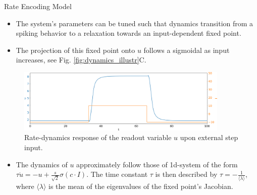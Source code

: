 \documentclass{beamer}
\begin{document}
\begin{frame}[t]
\begin{columns}[t]
\begin{column}{.45\textwidth}
\begin{myblock}{Rate Encoding Model}
\begin{itemize}
\item The system's parameters can be tuned such that dynamics transition from a spiking behavior to a relaxation towards an input-dependent fixed point.
\item The projection of this fixed point onto $u$ follows a sigmoidal as input increases, see Fig. \ref{fig:dynamics_illustr}C.  
\end{itemize}
\begin{figure}
\includegraphics[width=0.9\textwidth]{../figures/graphics/rate_dyn_u_step_illustr.png}
\caption{Rate-dynamics response of the readout variable $u$ upon external step input.}
\label{fig:rate_dyn_u_step}
\end{figure}
\begin{itemize}
\item The dynamics of $u$ approximately follow those of 1d-system of the form $\tau \dot{u} = -u + \frac{s}{\sqrt{2}}\sigma\left( c \cdot I\right)$. The time constant $\tau$ is then described by $\tau = -\frac{1}{\langle \lambda \rangle}$, where $\langle \lambda \rangle$ is the mean of the eigenvalues of the fixed point's Jacobian.
\end{itemize}
\end{myblock}


\end{column}
\end{columns}
\end{frame}
\end{document}
